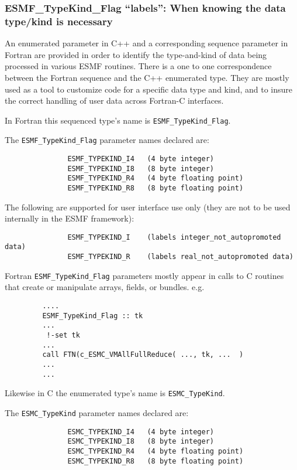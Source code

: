 \subsubsection{ESMF\_TypeKind\_Flag ``labels'': When knowing the data type/kind is necessary}

An enumerated parameter in C++ and a corresponding sequence parameter in Fortran are provided in order to identify the type-and-kind of data being processed in various ESMF routines. There is a one to one correspondence between the Fortran sequence and the C++ enumerated type. They are mostly used as a tool to customize code for a specific data type and kind, and to insure the correct handling of user data across Fortran-C interfaces.

In Fortran this sequenced type's name is {\tt ESMF\_TypeKind\_Flag}.

The {\tt ESMF\_TypeKind\_Flag} parameter names declared are:

\begin{verbatim}
               ESMF_TYPEKIND_I4   (4 byte integer)
               ESMF_TYPEKIND_I8   (8 byte integer)
               ESMF_TYPEKIND_R4   (4 byte floating point)
               ESMF_TYPEKIND_R8   (8 byte floating point)
\end{verbatim}

The following are supported for user interface use only (they are not to be used internally in the ESMF framework):
\begin{verbatim}
               ESMF_TYPEKIND_I    (labels integer_not_autopromoted data)
               ESMF_TYPEKIND_R    (labels real_not_autopromoted data)
\end{verbatim}

Fortran {\tt ESMF\_TypeKind\_Flag} parameters mostly appear in calls to C routines that create or manipulate arrays, fields, or bundles. e.g.
\begin{verbatim}
         ....
         ESMF_TypeKind_Flag :: tk
         ...
          !-set tk
         ...
         call FTN(c_ESMC_VMAllFullReduce( ..., tk, ...  )
         ...
         ...
\end{verbatim}
Likewise in C the enumerated type's name is {\tt ESMC\_TypeKind}.

The {\tt ESMC\_TypeKind} parameter names declared are:
\begin{verbatim}
               ESMC_TYPEKIND_I4   (4 byte integer)
               ESMC_TYPEKIND_I8   (8 byte integer)
               ESMC_TYPEKIND_R4   (4 byte floating point)
               ESMC_TYPEKIND_R8   (8 byte floating point)
\end{verbatim}

